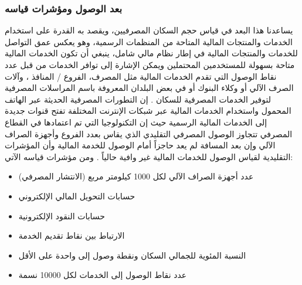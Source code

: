 \documentclass[10pt,a4paper]{report}
\begin{document}
\begin{doublespacing}
\subsubsection{بعد الوصول ومؤشرات قياسه}
يساعدنا هذا البعد في قياس حجم السكان المصرفيين، ويقصد به القدرة على استخدام الخدمات والمنتجات المالية المتاحة من المنظمات الرسمية، وهو يعكس عمق التواصل للخدمات والمنتجات المالية في إطار نظام مالي شامل، ينبغي أن تكون الخدمات المالية متاحة بسهولة للمستخدمين المحتملين ويمكن الإشارة إلى توافر الخدمات من قبل عدد نقاط الوصول التي تقدم الخدمات المالية مثل المصرف، الفروع / المنافذ ، وآلات الصرف الآلي  أو وكلاء البنوك  أو في بعض البلدان المعروفة باسم المراسلات المصرفية  لتوفير الخدمات المصرفية للسكان . إن التطورات المصرفية الحديثة عبر الهاتف المحمول واستخدام الخدمات المالية عبر شبكات الإنترنت المختلفة تفتح قنوات جديدة إلى الخدمات المالية الرسمية حيث إن التكنولوجيا التي تم اعتمادها في القطاع المصرفي تتجاوز الوصول المصرفي التقليدي الذي يقاس بعدد الفروع وأجهزة الصراف الآلي وإن بعد المسافة لم يعد حاجزاً أمام الوصول للخدمة المالية وأن المؤشرات التقليدية لقياس الوصول للخدمات المالية غير وافية حالياً . ومن مؤشرات قياسه الآتي:
\begin{itemize}
	\item عدد أجهزة الصراف الآلي لكل 1000 كيلومتر مربع (الانتشار المصرفي)
	\item حسابات التحويل المالي الإلكتروني
	\item حسابات النقود الإلكترونية
	\item الارتباط بين نقاط تقديم الخدمة
	\item النسبة المئوية للجمالي السكان ونقطة وصول إلى واحدة على الأقل
	\item عدد نقاط الوصول إلى الخدمات لكل 10000 نسمة
\end{itemize}

\end{doublespacing}
\end{document}
